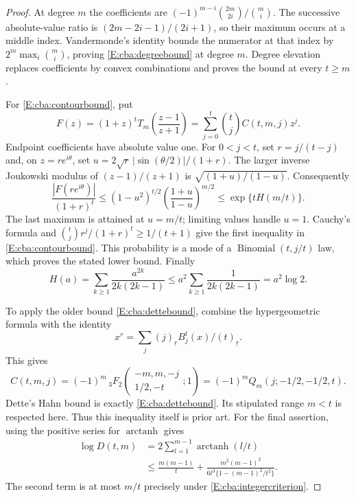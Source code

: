 \documentclass[11pt,a4paper]{article}
\theoremstyle{definition}
\theoremstyle{remark}
\numberwithin{equation}{section}
\begin{document}
\begin{proof}
At degree $m$ the coefficients are
$(-1)^{m-i}\binom{2m}{2i}/\binom mi$. The successive absolute-value ratio
is $(2m-2i-1)/(2i+1)$, so their maximum occurs at a middle index.
Vandermonde's identity bounds the numerator at that index by
$2^m\max_i\binom mi$, proving \eqref{E:cba:degreebound} at degree $m$.
Degree elevation replaces coefficients by convex combinations and proves
the bound at every $t\ge m$.

For \eqref{E:cba:contourbound}, put
\[
 F(z)=(1+z)^tT_m\left(\frac{z-1}{z+1}\right)
     =\sum_{j=0}^t\binom tj C(t,m,j)z^j.
\]
Endpoint coefficients have absolute value one. For $0<j<t$, set
$r=j/(t-j)$ and, on $z=re^{i\theta}$, set
$u=2\sqrt r\,|\sin(\theta/2)|/(1+r)$. The larger inverse Joukowski
modulus of $(z-1)/(z+1)$ is
$\sqrt{(1+u)/(1-u)}$. Consequently
\[
 \frac{|F(re^{i\theta})|}{(1+r)^t}
 \le(1-u^2)^{t/2}
          \left(\frac{1+u}{1-u}\right)^{m/2}
 \le \exp\{tH(m/t)\}.
\]
The last maximum is attained at $u=m/t$; limiting values handle $u=1$.
Cauchy's formula and
$\binom tj r^j/(1+r)^t\ge1/(t+1)$ give the first inequality in
\eqref{E:cba:contourbound}. This probability is a mode of a
$\operatorname{Binomial}(t,j/t)$ law, which proves the stated lower bound.
Finally
\[
 H(a)=\sum_{k\ge1}\frac{a^{2k}}{2k(2k-1)}
       \le a^2\sum_{k\ge1}\frac1{2k(2k-1)}=a^2\log2.
\]

To apply the older bound \eqref{E:cba:dettebound}, combine the
hypergeometric formula with the identity
\[
 x^r=\sum_j(j)_{\underline r}B_j^t(x)/(t)_{\underline r}.
\]
This gives
\[
 C(t,m,j)=(-1)^m\,{}_3F_2
       \left(\begin{matrix}-m,m,-j\\1/2,-t\end{matrix};1\right)
       =(-1)^mQ_m(j;-1/2,-1/2,t).
\]
Dette's Hahn bound \cite[Corollary~3.6(b)]{CB_Dette} is exactly
\eqref{E:cba:dettebound}. Its stipulated range $m<t$ is respected here.
Thus this inequality itself is prior art. For the final assertion,
using the positive series for $\operatorname{arctanh}$ gives
\begin{align*}
 \log D(t,m)
 &=2\sum_{l=1}^{m-1}\operatorname{arctanh}(l/t)\\
 &\le \frac{m(m-1)}t+
 \frac{m^2(m-1)^2}
 {6t^3\{1-(m-1)^2/t^2\}}.
\end{align*}
The second term is at most $m/t$ precisely under
\eqref{E:cba:integercriterion}.
\end{proof}
\end{document}

